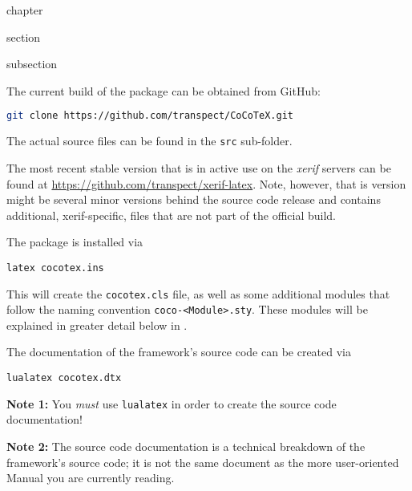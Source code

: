 \begin{Heading}{chapter}
\end{Heading}

\begin{Heading}{section}
\end{Heading}

\begin{Heading}{subsection}
\end{Heading}

The current build of the package can be obtained from GitHub:
\begin{lstlisting}[style=tex,language=bash]
git clone https://github.com/transpect/CoCoTeX.git
\end{lstlisting}
The actual source files can be found in the \lstinline{src} sub-folder.


The most recent stable version that is in active use on the
\textit{xerif} servers can be found at
\url{https://github.com/transpect/xerif-latex}. Note, however, that is
version might be several minor versions behind the source code release
and contains additional, xerif-specific, files that are not part of
the official {\CoCoTeX} build.

The package is installed via
\begin{lstlisting}[style=bash]
latex cocotex.ins
\end{lstlisting}
This will create the \lstinline{cocotex.cls} file, as well as some
additional modules that follow the naming convention
\lstinline{coco-<Module>.sty}. These modules will be explained in
greater detail below in .

The documentation of the framework's source code can be created via
\begin{lstlisting}[style=bash]
lualatex cocotex.dtx
\end{lstlisting}
\textbf{Note 1:} You \textit{must} use \lstinline{lualatex} in order to
create the source code documentation!

\textbf{Note 2:} The source code documentation is a technical breakdown
of the framework's source code; it is not the same document as the
more user-oriented Manual you are currently reading.


